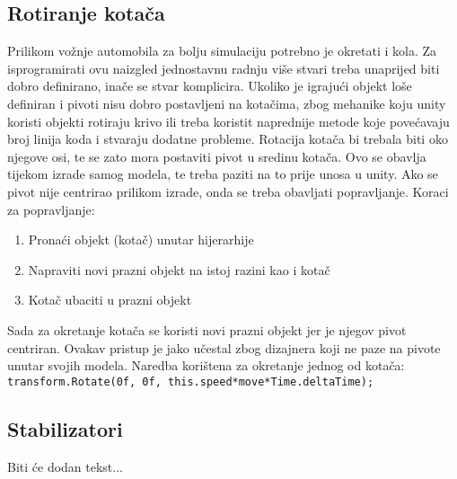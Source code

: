 \subsection{Rotiranje kotača}
Prilikom vožnje automobila za bolju simulaciju potrebno je okretati i kola. Za isprogramirati ovu naizgled jednostavnu radnju više stvari treba unaprijed biti dobro definirano, inače se stvar komplicira. Ukoliko je igrajući objekt loše definiran i pivoti nisu dobro postavljeni na kotačima, zbog mehanike koju unity koristi objekti rotiraju krivo ili treba koristit naprednije metode koje povećavaju broj linija koda i stvaraju dodatne probleme. Rotacija kotača bi trebala biti oko njegove osi, te se zato mora postaviti pivot u sredinu kotača. Ovo se obavlja tijekom izrade samog modela, te treba paziti na to prije unosa u unity. Ako se pivot nije centrirao prilikom izrade, onda se treba obavljati popravljanje. Koraci za popravljanje:
\begin{enumerate}
	\item Pronaći objekt (kotač) unutar hijerarhije
	\item Napraviti novi prazni objekt na istoj razini kao i kotač
	\item Kotač ubaciti u prazni objekt
\end{enumerate}
Sada za okretanje kotača se koristi novi prazni objekt jer je njegov pivot centriran. Ovakav pristup je jako učestal zbog dizajnera koji ne paze na pivote unutar svojih modela. Naredba korištena za okretanje jednog od kotača:
\vspace{2mm}
\small\texttt{ transform.Rotate(0f, 0f, this.speed*move*Time.deltaTime); }

\subsection{Stabilizatori}
Biti će dodan tekst...

